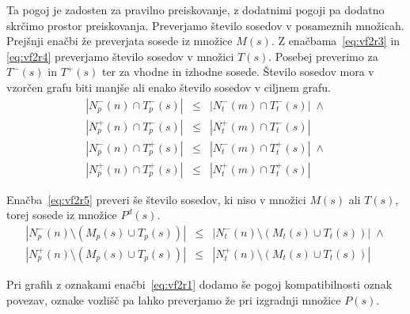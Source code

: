 \documentclass[a4paper, 12pt, ]{book}
\begin{document}
	Ta pogoj je zadosten za pravilno preiskovanje, z dodatnimi pogoji pa dodatno skrčimo prostor preiskovanja. Preverjamo število sosedov v posameznih 
	množicah.  Prejšnji enačbi že preverjata sosede iz množice $M(s)$. Z enačbama~\ref{eq:vf2r3} in \ref{eq:vf2r4} preverjamo število sosedov v
	množici $T(s)$. Posebej preverimo za $T^-(s)$ in $T^+(s)$ ter za vhodne in izhodne sosede. Število sosedov mora v vzorčen grafu biti manjše ali
	enako število sosedov v ciljnem grafu.
	\begin{equation}
	\label{eq:vf2r3}
	\begin{array}{rcl}
	|N_p^-(n) \cap T_p^-(s)|   \! & \! \leq \! & \! |N_t^-(m) \cap T_t^-(s)| \; \wedge \\
	|N_p^+(n) \cap T_p^-(s)|  \! & \! \leq \! & \! |N_t^+(m) \cap T_t^-(s)|
	\end{array}
	\end{equation}
	\begin{equation}
	\label{eq:vf2r4}
	\begin{array}{rcl}
	|N_p^-(n) \cap T_p^+(s)|   \! & \! \leq \! & \! |N_t^-(m) \cap T_t^+(s)| \; \wedge \\
	|N_p^+(n) \cap T_p^+(s)|  \! & \! \leq \! & \!|N_t^+(m) \cap T_t^+(s)|
	\end{array}
	\end{equation}
	
	Enačba~\ref{eq:vf2r5} preveri še število sosedov, ki niso v množici $M(s)$ ali $T(s)$, torej sosede iz množice $P^d(s)$.
	\begin{equation}
	\label{eq:vf2r5}
	\begin{array}{rcl}
	|N_p^-(n) \setminus (M_p(s) \cup T_p(s))| \! & \! \leq \! & \! |N_t^-(n) \setminus (M_t(s) \cup T_t(s))| \; \wedge \\
	|N_p^+(n) \setminus (M_p(s) \cup T_p(s))| \! & \! \leq \! & \! |N_t^+(n) \setminus (M_t(s) \cup T_t(s))|
	\end{array}
	\end{equation}
	
	Pri grafih z oznakami enačbi~\ref{eq:vf2r1} dodamo še pogoj kompatibilnosti oznak povezav, oznake vozlišč pa lahko preverjamo že pri izgradnji
	množice $P(s)$.
\end{document}
